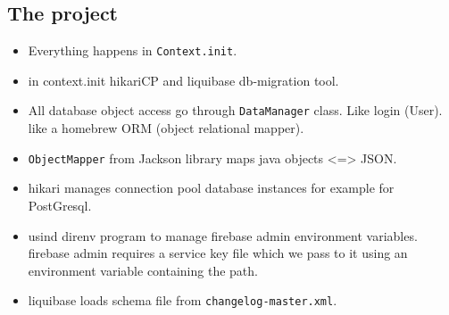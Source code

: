 \documentclass[a4paper]{article}
\begin{document}
\subsection*{The project}
\begin{itemize}
    \item Everything happens in \lstinline{Context.init}.
    \item in context.init hikariCP and liquibase db-migration tool.
    \item All database object access go through \lstinline{DataManager} class. Like login (User). like a homebrew ORM (object relational mapper).
    \item \lstinline{ObjectMapper} from Jackson library maps java objects <=> JSON.
    \item hikari manages connection pool database instances for example for PostGresql.
    \item usind direnv program to manage firebase admin environment variables. firebase admin requires a service
          key file which we pass to it using an environment variable containing the path.
    \item liquibase loads schema file from \lstinline{changelog-master.xml}.
\end{itemize}


\end{document}
